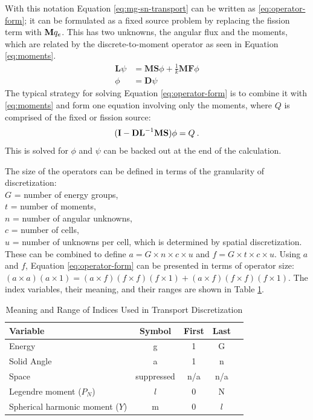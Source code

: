 With this notation Equation \eqref{eq:mg-sn-transport} can be written as \eqref{eq:operator-form}; it can be formulated as a fixed source problem by replacing the fission term with $\mathbf{M}q_{e}$. This has two unknowns, the angular flux and the moments, which are related by the discrete-to-moment operator as seen in Equation \eqref{eq:moments}.
%
\begin{align}
  \mathbf{L} \psi &= \mathbf{MS}\phi + \frac{1}{k}\mathbf{MF}\phi \label{eq:operator-form}\\
  \phi &= \mathbf{D}\psi 
  \label{eq:moments}
\end{align}
The typical strategy for solving Equation \eqref{eq:operator-form} is to combine it with \eqref{eq:moments} and form one equation involving only the moments, where $Q$ is comprised of the fixed or fission source: 
\begin{equation}
   (\mathbf{I} - \mathbf{DL}^{-1}\mathbf{MS})\phi = Q \:.
\end{equation}  
This is solved for $\phi$ and $\psi$ can be backed out at the end of the calculation.

The size of the operators can be defined in terms of the granularity of discretization: \\
%
\indent $G$ = number of energy groups, \\
\indent $t$ = number of moments, \\
\indent $n$ = number of angular unknowns, \\
\indent $c$ = number of cells, \\
\indent $u$ = number of unknowns per cell, which is determined by spatial discretization. \\
%
These can be combined to define $a = G \times n \times c \times u$ and $f = G \times t \times c \times u$. Using $a$ and $f$, Equation \eqref{eq:operator-form} can be presented in terms of operator size: $(a \times a)(a \times 1) = (a \times f) (f \times f) (f \times 1) + (a \times f) (f \times f) (f \times 1)$. The index variables, their meaning, and their ranges are shown in Table \ref{table:index}. 
%
\begin{table}[!h]
\caption{Meaning and Range of Indices Used in Transport Discretization}
\begin{center}
\begin{tabular}{l c c c c}
\hline
Variable & Symbol & First & Last \\[0.5ex]
\hline
Energy & g & 1 & G \\
Solid Angle & a & 1 & n \\
Space & suppressed & n/a & n/a \\
Legendre moment ($P_{N}$) & $l$ & 0 & N \\
Spherical harmonic moment ($Y$) & m & 0 & $l$ \\
\hline
\end{tabular}
\end{center}
\label{table:index}
\end{table}
%

